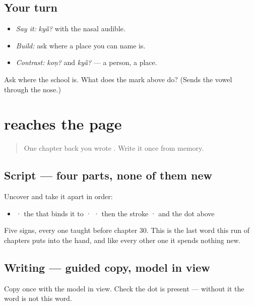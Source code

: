 \subsection*{Your turn}
\begin{itemize}
\raggedright
  \item \emph{Say it:} \emph{kyā̃?} with the nasal audible.
  \item \emph{Build:} ask where a place you can name is.
  \item \emph{Contrast:} \emph{koṇ?} and \emph{kyā̃?} — a person, a place.
\end{itemize}

\begin{tcolorbox}[breakable,colback=teal!4,colframe=teal!35!black,title={Before you move on}]
Ask where the school is. What does the mark above \textbf{} do? (Sends the vowel through the nose.)
\end{tcolorbox}
\section[\texorpdfstring{\gu{ક્યાં} (kyā̃)}{ક્યાં (kyā̃)}]{ reaches the page}

\label{lesson:GU-C37-kyaan-write}



\begin{quote}
One chapter back you wrote \textbf{}. Write it once from memory.
\end{quote}

\subsection*{Script — four parts, none of them new}
Uncover \textbf{} and take it apart in order:

\begin{itemize}
\raggedright
  \item \textbf{} · the \textbf{} that binds it to · \textbf{} · then the \textbf{} stroke · and the \textbf{} dot above
\end{itemize}

Five signs, every one taught before chapter 30. This is the last word this run of chapters puts into the hand, and like every other one it spends nothing new.

\subsection*{Writing — guided copy, model in view}
Copy \textbf{} once with the model in view. Check the dot is present — without it the word is not this word.

